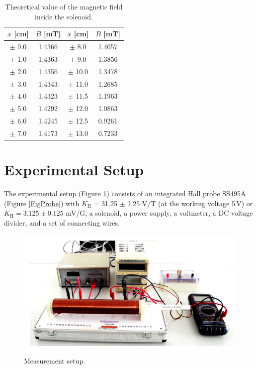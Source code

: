 \documentclass{article}
\begin{document}
\begin{table}[H]
\centering
\begin{tabular}{cc||cc}
\toprule
$x$ [cm] & $B$ [mT] & $x$ [cm] & $B$ [mT]\\
\hline
$\pm$ 0.0 & 1.4366 & $\pm$ 8.0 & 1.4057\\
$\pm$ 1.0 & 1.4363 & $\pm$ 9.0 & 1.3856\\
$\pm$ 2.0 & 1.4356 & $\pm$ 10.0 & 1.3478\\
$\pm$ 3.0 & 1.4343 & $\pm$ 11.0 & 1.2685\\
$\pm$ 4.0 & 1.4323 & $\pm$ 11.5 & 1.1963\\
$\pm$ 5.0 & 1.4292 & $\pm$ 12.0 & 1.0863\\
$\pm$ 6.0 & 1.4245 & $\pm$ 12.5 & 0.9261\\
$\pm$ 7.0 & 1.4173 & $\pm$ 13.0 & 0.7233\\
\bottomrule
\end{tabular}
 \caption{Theoretical value of the magnetic field inside the solenoid.}\label{TableTheoB}
\end{table}



		\section{Experimental Setup}

The experimental setup (Figure \ref{FigSetup}) consists of an integrated Hall probe SS495A (Figure \ref{FigProbe}) with $K_\text{H}$ = 31.25 $\pm$ 1.25 V/T (at the working voltage 5$\,$V) or $K_\text{H} = 3.125\pm0.125$ mV/G, a solenoid, a power supply, a voltmeter, a DC voltage divider, and a set of connecting wires.

\begin{figure}[H]
\centering
\includegraphics[scale=1.0]{setup.png}
\caption{Measurement setup.}\label{FigSetup}
\end{figure}
\end{document}
